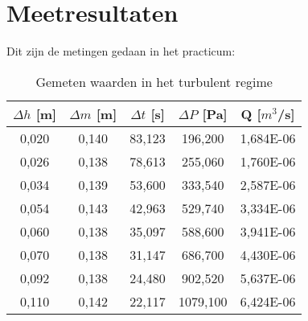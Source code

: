 \section{Meetresultaten}

Dit zijn de metingen gedaan in het practicum:\\
\begin{table}
    \centering
    \label{tab:Lamflow}
    \caption{Gemeten waarden in het turbulent regime}
    \begin{tabular}{| c | c | c | c | c |}
        \hline
        $\Delta h$ [m]  & $\Delta m$ [m]    & $\Delta t$ [s]    & $\Delta P$ [Pa]   & Q [$m^3$/s]      \\ \hline
        0,020           & 0,140             & 83,123            & 196,200           & 1,684E-06        \\ \hline
        0,026           & 0,138             & 78,613            & 255,060           & 1,760E-06         \\ \hline
        0,034           & 0,139             & 53,600            & 333,540           & 2,587E-06         \\ \hline
        0,054           & 0,143             & 42,963            & 529,740           & 3,334E-06         \\ \hline 
        0,060           & 0,138             & 35,097            & 588,600           & 3,941E-06         \\ \hline
        0,070           & 0,138             & 31,147            & 686,700           & 4,430E-06         \\ \hline
        0,092           & 0,138             & 24,480            & 902,520           & 5,637E-06         \\ \hline
        0,110           & 0,142             & 22,117            & 1079,100          & 6,424E-06         \\ \hline
    \end{tabular}
\end{table}
